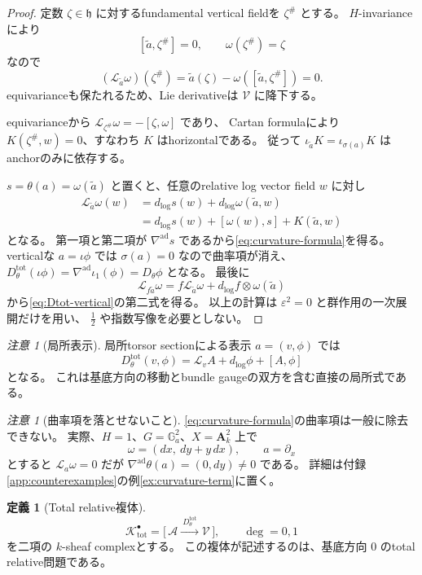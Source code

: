 \documentclass[uplatex,dvipdfmx,11pt]{jsarticle}
\numberwithin{equation}{section}
\theoremstyle{plain}
\theoremstyle{definition}
\newtheorem{definition}[theorem]{定義}
\theoremstyle{remark}
\newtheorem{remark}[theorem]{注意}
\newcommand{\GG}{\mathbb G}
\newcommand{\h}{\mathfrak h}
\newcommand{\shA}{\mathcal A}
\newcommand{\shV}{\mathcal V}
\newcommand{\Ktot}{\mathcal K_{\mathrm{tot}}^\bullet}
\newcommand{\Dtot}{D_\theta^{\mathrm{tot}}}
\newcommand{\nablaad}{\nabla^{\mathrm{ad}}}
\begin{document}
\begin{proof}
定数 \(\zeta\in\h\) に対するfundamental vertical fieldを \(\zeta^\#\) とする。
\(H\)-invarianceにより
\[
[\widetilde a,\zeta^\#]=0,\qquad\omega(\zeta^\#)=\zeta
\]
なので
\[
(\mathcal L_{\widetilde a}\omega)(\zeta^\#)
=\widetilde a(\zeta)-\omega([\widetilde a,\zeta^\#])=0.
\]
equivarianceも保たれるため、Lie derivativeは \(\shV\) に降下する。

equivarianceから \(\mathcal L_{\zeta^\#}\omega=-[\zeta,\omega]\) であり、
Cartan formulaにより \(K(\zeta^\#,w)=0\)、すなわち \(K\) はhorizontalである。
従って \(\iota_{\widetilde a}K=\iota_{\sigma(a)}K\) はanchorのみに依存する。

\(s=\theta(a)=\omega(\widetilde a)\) と置くと、任意のrelative log vector field \(w\) に対し
\[
\begin{aligned}
\mathcal L_{\widetilde a}\omega(w)
&=d_{\log}s(w)+d_{\log}\omega(\widetilde a,w)\\
&=d_{\log}s(w)+[\omega(w),s]+K(\widetilde a,w)
\end{aligned}
\]
となる。
第一項と第二項が \(\nablaad s\) であるから\eqref{eq:curvature-formula}を得る。
verticalな \(a=\iota\phi\) では \(\sigma(a)=0\) なので曲率項が消え、
\(\Dtot(\iota\phi)=\nablaad\iota_1(\phi)=D_\theta\phi\) となる。
最後に
\[
\mathcal L_{f\widetilde a}\omega
=f\mathcal L_{\widetilde a}\omega+d_{\log}f\otimes\omega(\widetilde a)
\]
から\eqref{eq:Dtot-vertical}の第二式を得る。
以上の計算は \(\varepsilon^2=0\) と群作用の一次展開だけを用い、
\(\tfrac12\) や指数写像を必要としない。
\end{proof}

\begin{remark}[局所表示]
\label{rem:Dtot-local}
局所torsor sectionによる表示 \(a=(v,\phi)\) では
\[
\Dtot(v,\phi)=\mathcal L_vA+d_{\log}\phi+[A,\phi]
\]
となる。
これは基底方向の移動とbundle gaugeの双方を含む直接の局所式である。
\end{remark}

\begin{remark}[曲率項を落とせないこと]
\label{rem:curvature-needed}
\eqref{eq:curvature-formula}の曲率項は一般に除去できない。
実際、\(H=1\)、\(G=\GG_a^2\)、\(X=\mathbf A_k^2\) 上で
\[
\omega=(dx,\ dy+y\,dx),\qquad a=\partial_x
\]
とすると \(\mathcal L_a\omega=0\) だが
\(\nablaad\theta(a)=(0,dy)\ne0\) である。
詳細は付録\ref{app:counterexamples}の例\ref{ex:curvature-term}に置く。
\end{remark}

\begin{definition}[Total relative複体]
\label{def:K-tot}
\begin{equation}
\label{eq:K-tot}
\Ktot=\bigl[\,\shA\xrightarrow{\ \Dtot\ }\shV\,\bigr],
\qquad\deg=0,1
\end{equation}
を二項の \(k\)-sheaf complexとする。
この複体が記述するのは、基底方向 \(0\) のtotal relative問題である。
\end{definition}
\end{document}
